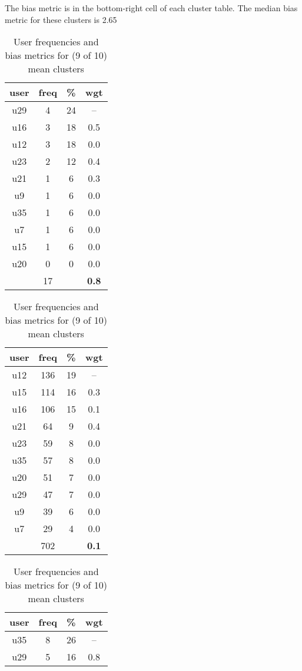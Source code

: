 \begin{appendices}
\begin{table}
\centering
\caption{User frequencies and bias metrics for (9 of 10) mean clusters}
{\small The bias metric is in the bottom-right cell of each cluster table. The median bias metric for these clusters is 2.65 \\}
\bigskip
\begin{tabular}{ |c|c|c|c| }
	\hline
	\textbf{user} & \textbf{freq} & \textbf{\%} & \textbf{wgt} \\
	\hline
	u29 & 4 & 24 & -- \\
	u16 & 3 & 18 & 0.5 \\
	u12 & 3 & 18 & 0.0 \\
	u23 & 2 & 12 & 0.4 \\
	u21 & 1 & 6 & 0.3 \\
	u9 & 1 & 6 & 0.0 \\
	u35 & 1 & 6 & 0.0 \\
	u7 & 1 & 6 & 0.0 \\
	u15 & 1 & 6 & 0.0 \\
	u20 & 0 & 0 & 0.0 \\
	 & 17 & & \textbf{0.8} \\
	\hline
\end{tabular}
\begin{tabular}{ |c|c|c|c| }
	\hline
	\textbf{user} & \textbf{freq} & \textbf{\%} & \textbf{wgt} \\
	\hline
	u12 & 136 & 19 & -- \\
	u15 & 114 & 16 & 0.3 \\
	u16 & 106 & 15 & 0.1 \\
	u21 & 64 & 9 & 0.4 \\
	u23 & 59 & 8 & 0.0 \\
	u35 & 57 & 8 & 0.0 \\
	u20 & 51 & 7 & 0.0 \\
	u29 & 47 & 7 & 0.0 \\
	u9 & 39 & 6 & 0.0 \\
	u7 & 29 & 4 & 0.0 \\
	 & 702 & & \textbf{0.1} \\
	\hline
\end{tabular}
\begin{tabular}{ |c|c|c|c| }
	\hline
	\textbf{user} & \textbf{freq} & \textbf{\%} & \textbf{wgt} \\
	\hline
	u35 & 8 & 26 & -- \\
	u29 & 5 & 16 & 0.8 \\

\end{tabular}
\end{table}
\end{appendices}
